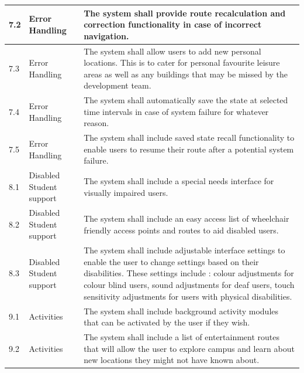 \documentclass[12pt]{article}
\begin{document}
\begin{longtable}{|p{}| p{} | p{} |}
\hline

7.2& Error Handling & The system shall provide route recalculation and correction functionality in case of incorrect navigation.\\

\hline

7.3& Error Handling & The system shall allow users to add new personal locations. This is to cater for personal favourite leisure areas as well as any buildings that may be missed by the development team. \\

\hline

7.4& Error Handling & The system shall automatically save the state at selected time intervals in case of system failure for whatever reason.\\

\hline

7.5& Error Handling & The system shall include saved state recall functionality to enable users to resume their route after a potential system failure.\\

\hline

8.1& Disabled Student support & The system shall include a special needs interface for visually impaired users.\\

\hline

8.2& Disabled Student support & The system shall include an easy access list of wheelchair friendly access points and routes to aid disabled users.\\

\hline

8.3& Disabled Student support & The system shall include adjustable interface settings to enable  the user to change settings based on their disabilities. These settings include : colour adjustments for colour blind users, sound adjustments for deaf users, touch sensitivity adjustments for users with physical disabilities.\\

\hline

9.1& Activities & The system shall include background activity modules that can be activated by the user if they wish.\\

\hline

9.2& Activities & The system shall include a list of entertainment routes that will allow the user to explore campus and learn about new locations they might not have known about.\\


\end{longtable}
\end{document}
